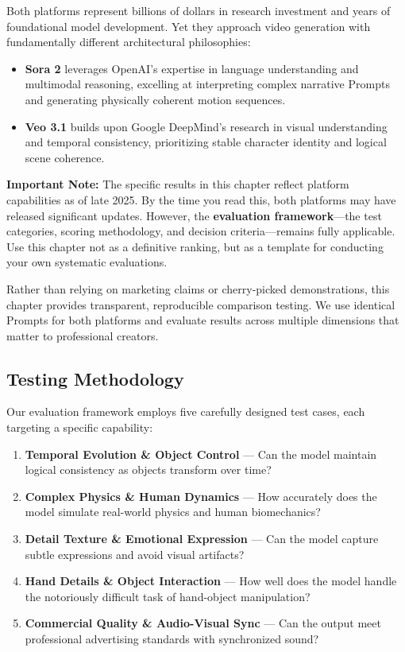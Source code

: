 Both platforms represent billions of dollars in research investment and years of foundational model development. Yet they approach video generation with fundamentally different architectural philosophies:

\begin{itemize}
    \item \textbf{Sora 2} leverages OpenAI's expertise in language understanding and multimodal reasoning, excelling at interpreting complex narrative Prompts and generating physically coherent motion sequences.
    \item \textbf{Veo 3.1} builds upon Google DeepMind's research in visual understanding and temporal consistency, prioritizing stable character identity and logical scene coherence.
\end{itemize}

\textbf{Important Note:} The specific results in this chapter reflect platform capabilities as of late 2025. By the time you read this, both platforms may have released significant updates. However, the \textbf{evaluation framework}---the test categories, scoring methodology, and decision criteria---remains fully applicable. Use this chapter not as a definitive ranking, but as a template for conducting your own systematic evaluations.

Rather than relying on marketing claims or cherry-picked demonstrations, this chapter provides transparent, reproducible comparison testing. We use identical Prompts for both platforms and evaluate results across multiple dimensions that matter to professional creators.

\subsection{Testing Methodology}
\label{subsec:testing-methodology}

Our evaluation framework employs five carefully designed test cases, each targeting a specific capability:

\begin{enumerate}
    \item \textbf{Temporal Evolution \& Object Control} --- Can the model maintain logical consistency as objects transform over time?
    \item \textbf{Complex Physics \& Human Dynamics} --- How accurately does the model simulate real-world physics and human biomechanics?
    \item \textbf{Detail Texture \& Emotional Expression} --- Can the model capture subtle expressions and avoid visual artifacts?
    \item \textbf{Hand Details \& Object Interaction} --- How well does the model handle the notoriously difficult task of hand-object manipulation?
    \item \textbf{Commercial Quality \& Audio-Visual Sync} --- Can the output meet professional advertising standards with synchronized sound?
\end{enumerate}

